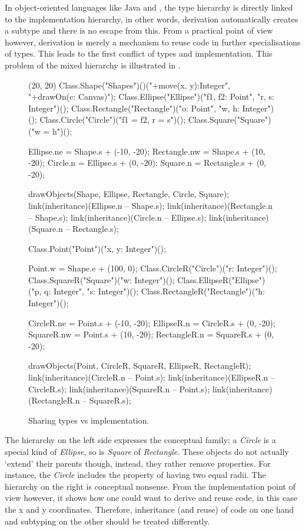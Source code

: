 In object-oriented languages like Java and \cpp, the type hierarchy
is directly linked to the implementation hierarchy, in other words,
derivation automatically creates a subtype and there is no escape from
this. From a practical point of view however, derivation is merely a
mechanism to reuse code in further specialisations of types. This leads
to the first conflict of types and implementation. This problem of
the mixed hierarchy is illustrated in 
\cite{simons_theory_2003-4}.

\begin{figure}[H]
	\centering
	\begin{emp}[classdiag](20, 20)
		Class.Shape("Shapes")()("+move(x, y):Integer", "+drawOn(c: Canvas)");
		Class.Ellipse("Ellipse")("f1, f2: Point", "r, s: Integer")();
		Class.Rectangle("Rectangle")("o: Point", "w, h: Integer")();
		Class.Circle("Circle")("{f1 = f2, r = s}")();
		Class.Square("Square")("{w = h}")();

		Ellipse.ne = Shape.s + (-10, -20);
		Rectangle.nw = Shape.s + (10, -20);
		Circle.n = Ellipse.s + (0, -20);
		Square.n = Rectangle.s + (0, -20);

		drawObjects(Shape, Ellipse, Rectangle, Circle, Square);
		link(inheritance)(Ellipse.n -- Shape.s);
		link(inheritance)(Rectangle.n -- Shape.s);
		link(inheritance)(Circle.n -- Ellipse.s);
		link(inheritance)(Square.n -- Rectangle.s);

		Class.Point("Point")("x, y: Integer")();

		Point.w = Shape.e + (100, 0);
		Class.CircleR("Circle")("r: Integer")();
		Class.SquareR("Square")("w: Integer")();
		Class.EllipseR("Ellipse")("p, q: Integer", "s: Integer")();
		Class.RectangleR("Rectangle")("h: Integer")();

		CircleR.ne = Point.s + (-10, -20);
		EllipseR.n = CircleR.s + (0, -20);
		SquareR.nw = Point.s + (10, -20);
		RectangleR.n = SquareR.s + (0, -20);

		drawObjects(Point, CircleR, SquareR, EllipseR, RectangleR);
		link(inheritance)(CircleR.n -- Point.s);
		link(inheritance)(EllipseR.n -- CircleR.s);
		link(inheritance)(SquareR.n -- Point.s);
		link(inheritance)(RectangleR.n -- SquareR.s);
	\end{emp}
	\caption{Sharing types vs implementation.}
	\label{fig:implementationConflict}
\end{figure}

The hierarchy on the left side expresses the conceptual family; a
\emph{Circle} is a special kind of \emph{Ellipse}, so is \emph{Square}
of \emph{Rectangle}. These objects do not actually `extend' their
parents though, instead, they rather remove properties. For instance,
the \emph{Circle} includes the property of having two equal radii. The hierarchy
on the right is conceptual nonsense. From the implementation point of
view however, it shows how one could want to derive and reuse code, in
this case the x and y coordinates. Therefore, inheritance (and reuse) of
code on one hand and subtyping on the other should be treated differently.

